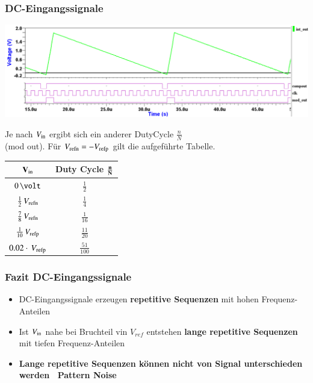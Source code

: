 \subsubsection{DC-Eingangssignale}

\begin{minipage}[c]{0.6\columnwidth}
    \includegraphics[width=\columnwidth]{images/sigma_delta_timing.png}

    Je nach $V_{\rm in}$ ergibt sich ein anderer DutyCycle $\frac{n}{N}$\\
    (mod out). Für $V_{\rm refn} = - V_{\rm refp}$ gilt die aufgeführte Tabelle. 
\end{minipage}
\hfill
\begin{minipage}[c]{0.38\columnwidth}
    \begin{tabular}{c | c}
        $\bf{V_{\rm in}}$               & \textbf{Duty Cycle} $\bf{\frac{n}{N}}$ \\
        \midrule
        $0 \, \volt$                    & $\frac{1}{2}$ \\
        $\frac{1}{2} \, V_{\rm refn}$   & $\frac{1}{4}$ \\
        $\frac{7}{8} \, V_{\rm refn}$   & $\frac{1}{16}$ \\
        $\frac{1}{10} \, V_{\rm refp}$  & $\frac{11}{20}$ \\
        $0.02 \cdot \, V_{\rm refp}$    & $\frac{51}{100}$
    \end{tabular}
\end{minipage}


\subsubsection*{Fazit DC-Eingangssignale}

\begin{itemize}
    \item DC-Eingangssignale erzeugen \textbf{repetitive Sequenzen} mit hohen Frequenz-Anteilen
    \item Ist $V_{\rm in}$ nahe bei Bruchteil vin $V_{ref}$ entstehen \textbf{lange repetitive Sequenzen} mit tiefen Frequenz-Anteilen
    \item \textbf{Lange repetitive Sequenzen können nicht von Signal unterschieden werden \textrightarrow\ Pattern Noise}
\end{itemize}
        

